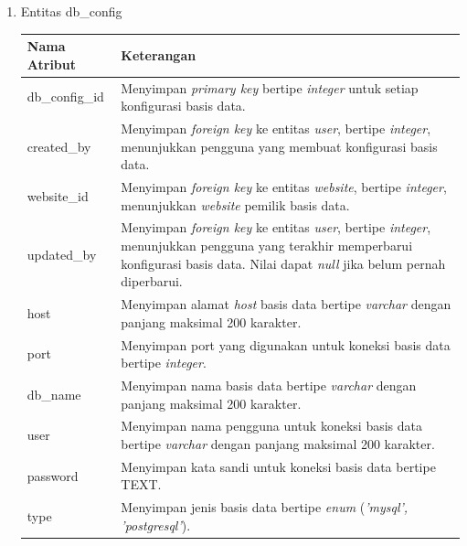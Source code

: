 \begin{enumerate}[label*=\arabic*.,ref=\arabic*]
\begin{enumerate}[label=\arabic*.]
        \item Entitas db\_config
        \vspace{-0.5em}
        \begin{table}[H]
            \centering
            \begin{tabular}{|p{3.25cm}|p{8cm}|}
                \hline
                \rowcolor[HTML]{DAE8FC} 
                {\color[HTML]{000000} Nama Atribut} & {\color[HTML]{000000} Keterangan}           \\ \hline
                db\_config\_id                     & Menyimpan \textit{primary key} bertipe \textit{integer} untuk setiap konfigurasi basis data. \\ \hline
                created\_by                        & Menyimpan \textit{foreign key} ke entitas \textit{user}, bertipe \textit{integer}, menunjukkan pengguna yang membuat konfigurasi basis data. \\ \hline
                website\_id                        & Menyimpan \textit{foreign key} ke entitas \textit{website}, bertipe \textit{integer}, menunjukkan \textit{website} pemilik basis data. \\ \hline
                updated\_by                        & Menyimpan \textit{foreign key} ke entitas \textit{user}, bertipe \textit{integer}, menunjukkan pengguna yang terakhir memperbarui konfigurasi basis data. Nilai dapat \textit{null} jika belum pernah diperbarui. \\ \hline
                host                               & Menyimpan alamat \textit{host} basis data bertipe \textit{varchar} dengan panjang maksimal 200 karakter. \\ \hline
                port                               & Menyimpan port yang digunakan untuk koneksi basis data bertipe \textit{integer}. \\ \hline
                db\_name                           & Menyimpan nama basis data bertipe \textit{varchar} dengan panjang maksimal 200 karakter. \\ \hline
                user                               & Menyimpan nama pengguna untuk koneksi basis data bertipe \textit{varchar} dengan panjang maksimal 200 karakter. \\ \hline
                password                           & Menyimpan kata sandi untuk koneksi basis data bertipe TEXT. \\ \hline
                type                               & Menyimpan jenis basis data bertipe \textit{enum} (\textit{'mysql', 'postgresql'}). \\ \hline

\end{tabular}
\end{table}
\end{enumerate}
\end{enumerate}
